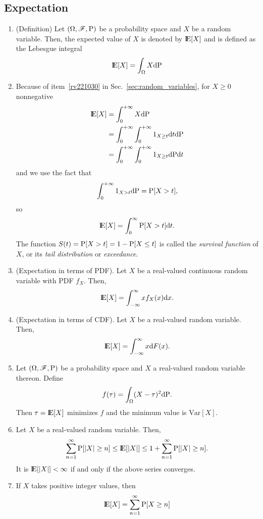 \documentclass[a4paper,10pt]{scrbook}
\begin{document}
\subsection{Expectation}
\begin{enumerate}  
\item (Definition)
 Let $(\Omega,\mathscr{F},\mathrm{P})$ be a probability space and $X$ be a random variable. Then, the expected value of 
 $X$ is denoted by $\E[X]$ and is defined as the Lebesgue integral
 \[
  \E[X] = \int_{\Omega} X\d \prob
 \]

\item 
 \label{gx1312}
 Because of item~\ref{rv221030} in Sec.~\ref{sec:random_variables}, for $X\geq 0$ nonnegative 
 \begin{align*}
  \E[X] &= \int_{0}^{+\infty} X \d \prob\\
        &= \int_{0}^{+\infty} \int_0^{+\infty} 1_{X\geq t}\d t \d \prob\\
        &= \int_{0}^{+\infty} \int_0^{+\infty} 1_{X\geq t} \d \prob \d t
 \end{align*}
 and we use the fact that 
 \[
  \int_{0}^{+\infty} 1_{X>t}\mathrm{d} \mathrm{P} = \mathrm{P}[X>t],
 \]
 so
 \[
  \E[X] = \int_0^\infty \prob[X>t]\d t.
 \]
 The function $S(t) = \mathrm{P}[X>t] = 1-\mathrm{P}[X\leq t]$ is called the \textit{survival function} 
 of $X$, or its \textit{tail distribution} or \textit{exceedance}.

 \item (Expectation in terms of PDF). Let \(X\) be a real-valued continuous random variable with PDF \(f_X\). 
       Then,
       \[
        \E[X] = \int_{-\infty}^{\infty} x f_X(x) \d x.
       \]
 \item (Expectation in terms of CDF). Let \(X\) be a real-valued random variable. Then,
 \[
  \E[X] = \int_{-\infty}^{\infty} x \d F(x).
 \]

 \item Let $(\Omega,\mathscr{F},\mathrm{P})$ be a probability space and $X$ a real-valued random variable thereon. Define 
 \[
  f(\tau) = \int_{\Omega}(X-\tau)^2\mathrm{d}\mathrm{P}.
 \]
 Then $\tau = \E[X]$ minimizes $f$ and the minimum value is $\mathrm{Var}[X]$.
 \item Let $X$ be a real-valued random variable. Then,
 \[
  \sum_{n=1}^{\infty}\prob[|X|\geq n] \leq \E[|X|] \leq 1+ \sum_{n=1}^{\infty}\prob[|X|\geq n].
 \]
 It is $\E[|X|]<\infty$ if and only if the above series converges.
 \item If $X$ takes positive integer values, then
 \[
  \E[X] = \sum_{n=1}^{\infty}\prob[X\geq n]
 \]


\end{enumerate}
\end{document}
